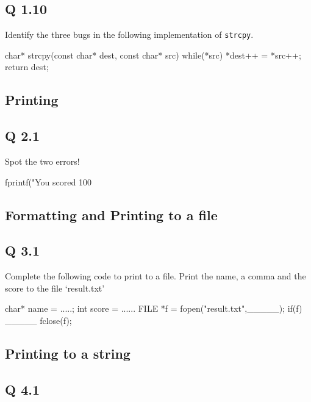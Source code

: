 \subsection{Q 1.10}\label{q-1.10}

Identify the three bugs in the following implementation of \texttt{strcpy}.

\begin{code}[language=C]
char* strcpy(const char* dest, const char* src) {
  while(*src) { *dest++ = *src++; }
  return dest;
}
\end{code}

\subsection{Printing}\label{printing}

\subsection{Q 2.1}\label{q-2.1}

Spot the two errors!

\begin{code}[language=C]
fprintf("You scored 100%
\end{code}

\subsection{Formatting and Printing to a file}\label{formatting-and-printing-to-a-file}

\subsection{Q 3.1}\label{q-3.1}

Complete the following code to print to a file. Print the name, a comma and the score to the file `result.txt'

\begin{code}[language=C]
char* name = .....;
int score = ......
FILE *f = fopen("result.txt",_____);
if(f) {
    _____
}
fclose(f);
\end{code}

\subsection{Printing to a string}\label{printing-to-a-string}

\subsection{Q 4.1}\label{q-4.1}

